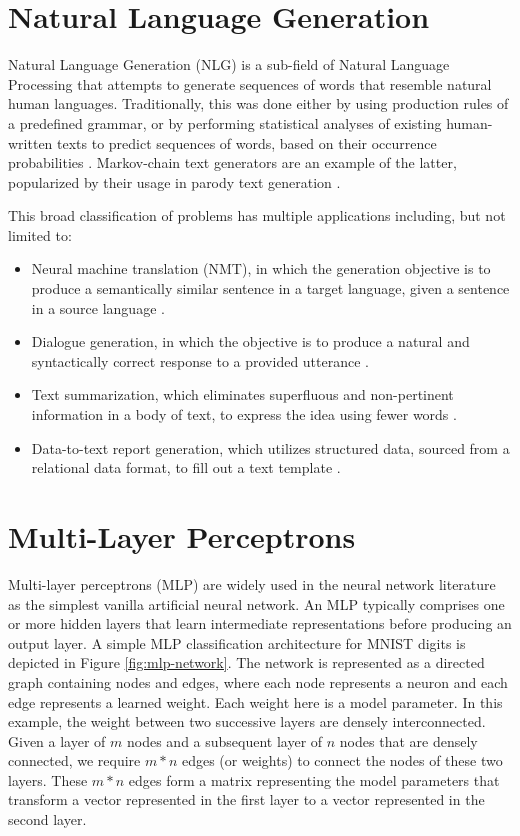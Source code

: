 \section{Natural Language Generation}

Natural Language Generation (NLG) is a sub-field of Natural Language Processing that attempts to generate sequences of words that resemble natural human languages. Traditionally, this was done either by using production rules of a predefined grammar, or by performing statistical analyses of existing human-written texts to predict sequences of words, based on their occurrence probabilities \citep{cambria2014jumping}. Markov-chain text generators are an example of the latter, popularized by their usage in parody text generation \citep{jelinek1985markov}.

This broad classification of problems has multiple applications including, but not limited to:
\begin{itemize}
	\item Neural machine translation (NMT), in which the generation objective is to produce a semantically similar sentence in a target language, given a sentence in a source language \citep{bahdanau2014neural,cho2014properties,luong2015effective,wu2016google}.
	\item Dialogue generation, in which the objective is to produce a natural and syntactically correct response to a provided utterance \citep{cavazza2005dialogue,li2016persona,li2016deep,li2017adversarial}.
	\item Text summarization, which eliminates superfluous and non-pertinent information in a body of text, to express the idea using fewer words \citep{barzilay1999using,gong2001generic,conroy2001text}.
	\item Data-to-text report generation, which utilizes structured data, sourced from a relational data format, to fill out a text template \citep{goldberg1994using,reiter2007architecture,gatt2009data}.
\end{itemize}


\section{Multi-Layer Perceptrons}

Multi-layer perceptrons (MLP) are widely used in the neural network literature as the simplest vanilla artificial neural network. An MLP typically comprises one or more hidden layers that learn intermediate representations before producing an output layer. A simple MLP classification architecture for MNIST digits \citep{lecun2010mnist,deng2012mnist} is depicted in Figure \ref{fig:mlp-network}. The network is represented as a directed graph containing nodes and edges, where each node represents a neuron and each edge represents a learned weight. Each weight here is a model parameter. In this example, the weight between two successive layers are densely interconnected. Given a layer of $m$ nodes and a subsequent layer of $n$ nodes that are densely connected, we require $m*n$ edges (or weights) to connect the nodes of these two layers. These $m*n$ edges form a matrix representing the model parameters that transform a vector represented in the first layer to a vector represented in the second layer.

